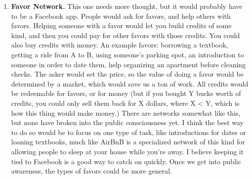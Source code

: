 \documentclass[paper=a4, fontsize=11pt]{scrartcl} %
\numberwithin{equation}{section} %
\numberwithin{figure}{section} %
\numberwithin{table}{section} %
\begin{document}
\begin{enumerate}
\item \textbf{Favor Network.}  This one needs more thought, but it would probably have to be a Facebook app.  People would ask for favors, and help others with favors.  Helping someone with a favor would let you build credits of some kind, and then you could pay for other favors with those credits.  You could also buy credits with money.  An example favors: borrowing a textbook, getting a ride from A to B, using someone's parking spot, an introduction to someone in order to date them, help organizing an apartment before cleaning checks.  The asker would set the price, so the value of doing a favor would be determined by a market, which would save us a ton of work.  All credits would be redeemable for favors, or for money (but if you bought Y bucks worth of credits, you could only sell them back for X dollars, where X < Y, which is how this thing would make money.)  There are networks somewhat like this, but none have broken into the public consciousness yet.  I think the best way to do so would be to focus on one type of task, like introductions for dates or loaning textbooks, much like AirBnB is a specialized network of this kind for allowing people to sleep at your house while you're away.  I believe keeping it tied to Facebook is a good way to catch on quickly.  Once we get into public awareness, the types of favors could be more general.  



\end{enumerate}
\end{document}

